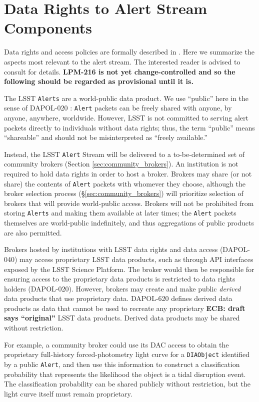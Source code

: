 \section{Data Rights to Alert Stream Components}\label{sec:data_rights}

Data rights and access policies are formally described in . 
Here we summarize the aspects most relevant to the alert stream.
The interested reader is advised to consult  for details.
\textbf{LPM-216 is not yet change-controlled and so the following should be regarded as provisional until it is.}


The LSST {\tt Alerts} are a world-public data product.
We use ``public'' here in the sense of DAPOL-020 :  \texttt{Alert} packets can be freely shared with anyone, by anyone, anywhere, worldwide.
However, LSST is not committed to serving alert packets directly to individuals without data rights;
thus, the term ``public'' means ``shareable'' and should not be misinterpreted as ``freely available.''

Instead, the LSST {\tt Alert} Stream will be delivered to a to-be-determined set of community brokers (Section \ref{sec:community_brokers}).
An institution is not required to hold data rights in order to host a broker.
Brokers may share (or not share) the contents of {\tt Alert} packets with whomever they choose, 
although the broker selection process (\S \ref{sec:community_brokers}) will prioritize selection of brokers that will provide world-public access.
Brokers will not be prohibited from storing {\tt Alerts} and making them available at later times;
the {\tt Alert} packets themselves are world-public indefinitely, and thus aggregations of public products are also permitted.

Brokers hosted by institutions with LSST data rights and data access (DAPOL-040) may access proprietary LSST data products, such as through API interfaces exposed by the LSST Science Platform.
The broker would then be responsible for ensuring access to the proprietary data products is restricted to data rights holders (DAPOL-020).
However, brokers may create and make public \textit{derived} data products that use proprietary data.
DAPOL-620 defines derived data products as data that cannot be used to recreate any proprietary \textbf{ECB: draft says ``original''} LSST data products.
Derived data products may be shared without restriction.

For  example,  a community broker could use its DAC access to obtain the proprietary full-history forced-photometry light curve for a \texttt{DIAObject} identified by a public {\tt Alert}, 
and then use this information to construct a classification probability that represents the likelihood the object is a tidal disruption event.
The classification probability can be shared publicly without restriction, but the light curve itself must remain proprietary.

